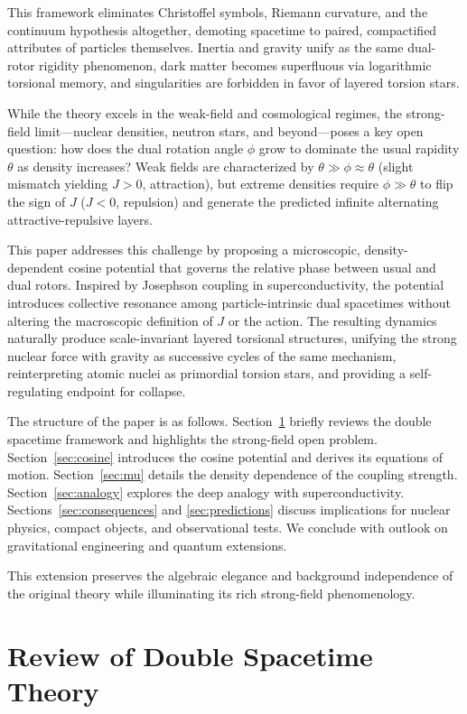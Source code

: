\documentclass[a4paper]{article}
\begin{document}
This framework eliminates Christoffel symbols, Riemann curvature, and the continuum hypothesis altogether, demoting spacetime to paired, compactified attributes of particles themselves. Inertia and gravity unify as the same dual-rotor rigidity phenomenon, dark matter becomes superfluous via logarithmic torsional memory, and singularities are forbidden in favor of layered torsion stars.

While the theory excels in the weak-field and cosmological regimes, the strong-field limit—nuclear densities, neutron stars, and beyond—poses a key open question: how does the dual rotation angle $\phi$ grow to dominate the usual rapidity $\theta$ as density increases? Weak fields are characterized by $\theta \gg \phi \approx \theta$ (slight mismatch yielding $J > 0$, attraction), but extreme densities require $\phi \gg \theta$ to flip the sign of $J$ ($J < 0$, repulsion) and generate the predicted infinite alternating attractive-repulsive layers.

This paper addresses this challenge by proposing a microscopic, density-dependent cosine potential that governs the relative phase between usual and dual rotors. Inspired by Josephson coupling in superconductivity, the potential introduces collective resonance among particle-intrinsic dual spacetimes without altering the macroscopic definition of $J$ or the action. The resulting dynamics naturally produce scale-invariant layered torsional structures, unifying the strong nuclear force with gravity as successive cycles of the same mechanism, reinterpreting atomic nuclei as primordial torsion stars, and providing a self-regulating endpoint for collapse.

The structure of the paper is as follows. Section~\ref{sec:review} briefly reviews the double spacetime framework and highlights the strong-field open problem. Section~\ref{sec:cosine} introduces the cosine potential and derives its equations of motion. Section~\ref{sec:mu} details the density dependence of the coupling strength. Section~\ref{sec:analogy} explores the deep analogy with superconductivity. Sections~\ref{sec:consequences} and \ref{sec:predictions} discuss implications for nuclear physics, compact objects, and observational tests. We conclude with outlook on gravitational engineering and quantum extensions.

This extension preserves the algebraic elegance and background independence of the original theory while illuminating its rich strong-field phenomenology.

\section{Review of Double Spacetime Theory}
\label{sec:review}
\end{document}
